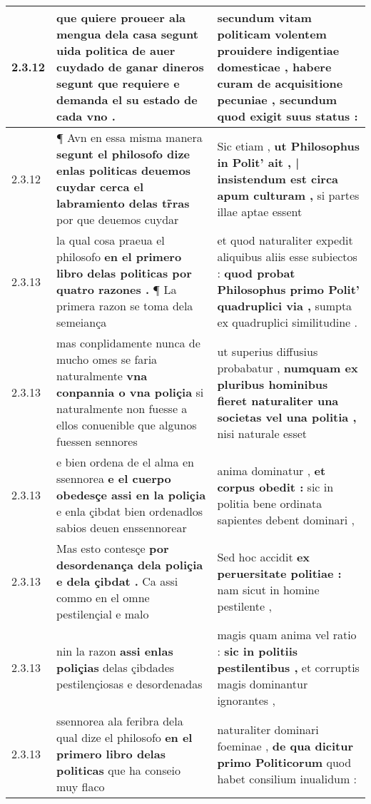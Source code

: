 \begin{tabular}{|p{1cm}|p{6.5cm}|p{6.5cm}|}
2.3.12 & que quiere proueer ala mengua dela casa \textbf{ segunt uida politica de auer cuydado de ganar dineros segunt que requiere } e demanda el su estado de cada vno . & secundum vitam politicam volentem prouidere indigentiae domesticae , \textbf{ habere curam de acquisitione pecuniae , } secundum quod exigit suus status : \\\hline
2.3.12 & ¶ Avn en essa misma manera \textbf{ segunt el philosofo dize enlas politicas deuemos cuydar cerca el labramiento delas tr̃ras } por que deuemos cuydar & Sic etiam , \textbf{ ut Philosophus in Polit’ ait , | insistendum est circa apum culturam , } si partes illae aptae essent \\\hline
2.3.13 & la qual cosa praeua el philosofo \textbf{ en el primero libro delas politicas por quatro razones . } ¶ La primera razon se toma dela semeiança & et quod naturaliter expedit aliquibus aliis esse subiectos : \textbf{ quod probat Philosophus primo Polit’ quadruplici via , } sumpta ex quadruplici similitudine . \\\hline
2.3.13 & mas conplidamente nunca de mucho omes se faria naturalmente \textbf{ vna conpannia o vna poliçia } si naturalmente non fuesse a ellos conuenible que algunos fuessen sennores & ut superius diffusius probabatur , \textbf{ numquam ex pluribus hominibus fieret naturaliter una societas vel una politia , } nisi naturale esset \\\hline
2.3.13 & e bien ordena de el alma en ssennorea \textbf{ e el cuerpo obedesçe assi en la poliçia } e enla çibdat bien ordenadlos sabios deuen enssennorear & anima dominatur , \textbf{ et corpus obedit : } sic in politia bene ordinata sapientes debent dominari , \\\hline
2.3.13 & Mas esto contesçe \textbf{ por desordenança dela poliçia e dela çibdat . } Ca assi commo en el omne pestilençial e malo & Sed hoc accidit \textbf{ ex peruersitate politiae : } nam sicut in homine pestilente , \\\hline
2.3.13 & nin la razon \textbf{ assi enlas poliçias } delas çibdades pestilençiosas e desordenadas & magis quam anima vel ratio : \textbf{ sic in politiis pestilentibus , } et corruptis magis dominantur ignorantes , \\\hline
2.3.13 & ssennorea ala feribra dela qual dize el philosofo \textbf{ en el primero libro delas politicas } que ha conseio muy flaco & naturaliter dominari foeminae , \textbf{ de qua dicitur primo Politicorum } quod habet consilium inualidum : \\\hline

\end{tabular}
